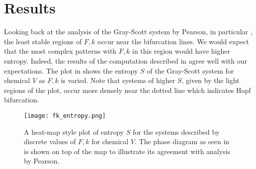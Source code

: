 \chapter{Results} \label{ch:results}

Looking back at the analysis of the Gray-Scott system by Pearson, in particular , the least stable regions of $F, k$ occur near the bifurcation lines. We would expect that the most complex patterns with $F, k$ in this region would have higher entropy. Indeed, the results of the computation described in  agree well with our expectations. The plot in  shows the entropy $S$ of the Gray-Scott system for chemical $V$ as $F, k$ is varied. Note that systems of higher $S$, given by the light regions of the plot, occur more densely near the dotted line which indicates Hopf bifurcation.

\begin{figure}[h]
	\centering
	\texttt{[image: fk\_entropy.png]}
	\caption{A heat-map style plot of entropy $S$ for the systems described by discrete values of $F, k$ for chemical $V$. The phase diagram as seen in  is shown on top of the map to illustrate its agreement with analysis by Pearson.} \label{fig:fk_entropy}
\end{figure}
